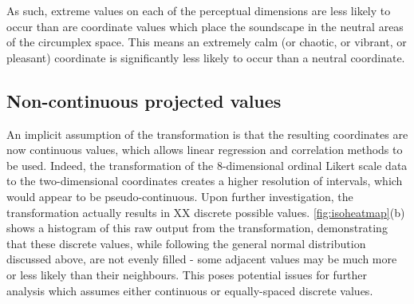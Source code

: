 As such, extreme values on each of the perceptual dimensions are less likely to occur than are coordinate values which place the soundscape in the neutral areas of the circumplex space. This means an extremely calm (or chaotic, or vibrant, or pleasant) coordinate is significantly less likely to occur than a neutral coordinate.


\subsection{Non-continuous projected values}
An implicit assumption of the transformation is that the resulting coordinates are now continuous values, which allows linear regression and correlation methods to be used. Indeed, the transformation of the 8-dimensional ordinal Likert scale data to the two-dimensional coordinates creates a higher resolution of intervals, which would appear to be pseudo-continuous. Upon further investigation, the transformation actually results in XX discrete possible values. \cref{fig:isoheatmap}(b) shows a histogram of this raw output from the transformation, demonstrating that these discrete values, while following the general normal distribution discussed above, are not evenly filled - some adjacent values may be much more or less likely than their neighbours. This poses potential issues for further analysis which assumes either continuous or equally-spaced discrete values.


